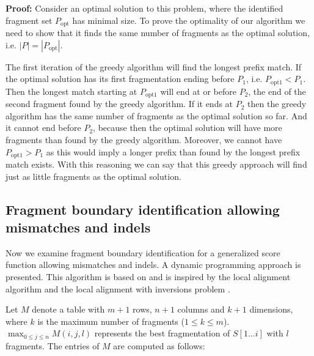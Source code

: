 \textbf{Proof:} Consider an optimal solution to this problem, where the
identified fragment set $P_{\mathrm{opt}}$ has minimal size. To prove
the optimality of our algorithm we need to show that it finds the same
number of fragments as the optimal solution, i.e. $|P| =
|P_{\mathrm{opt}}|$.

The first iteration of the greedy algorithm will find the longest prefix
match. If the optimal solution has its first fragmentation ending before
$P_1$, i.e. $P_{\mathrm{opt1}} < P_1$. Then the longest match starting at
$P_{\mathrm{opt1}}$ will end at or before $P_2$, the end of the second
fragment found by the greedy algorithm. If it ends at $P_2$ then the
greedy algorithm has the same number of fragments as the optimal
solution so far. And it cannot end before $P_2$, because then the
optimal solution will have more fragments than found by the greedy
algorithm. Moreover, we cannot have $P_{\mathrm{opt1}} > P_1$ as this
would imply a longer prefix than found by the longest prefix match
exists. With this reasoning we can say that this greedy approach will
find just as little fragments as the optimal solution.

\subsection{Fragment boundary identification allowing mismatches and indels}
Now we examine fragment boundary identification for a generalized score
function allowing mismatches and indels. A dynamic programming approach
is presented. This algorithm is based on and is inspired by the local
alignment algorithm \citep{smith1981identification} and the local
alignment with inversions problem \citep{schoniger1992local}.

Let $M$ denote a table with $m+1$ rows, $n+1$ columns and $k+1$
dimensions, where $k$ is the maximum number of fragments ($1 \leq k \leq
m$).  $\max_{0 \leq j \leq n}M(i,j,l)$ represents the best fragmentation
of $S[1 \dots i]$ with $l$ fragments. The entries of $M$ are computed as
follows:


